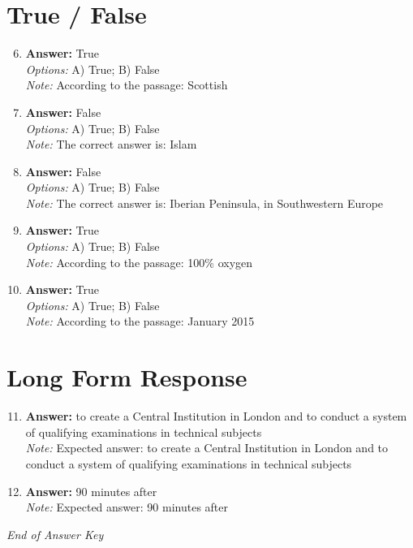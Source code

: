 \documentclass[12pt]{article}
\begin{document}
\section*{True / False}
\begin{enumerate}[label=\arabic*.]
\setcounter{enumi}{5}
\item \textbf{Answer:} True
\\ \textit{Options:} A) True; B) False
\\ \textit{Note:} According to the passage: Scottish
\item \textbf{Answer:} False
\\ \textit{Options:} A) True; B) False
\\ \textit{Note:} The correct answer is: Islam
\item \textbf{Answer:} False
\\ \textit{Options:} A) True; B) False
\\ \textit{Note:} The correct answer is: Iberian Peninsula, in Southwestern Europe
\item \textbf{Answer:} True
\\ \textit{Options:} A) True; B) False
\\ \textit{Note:} According to the passage: 100\% oxygen
\item \textbf{Answer:} True
\\ \textit{Options:} A) True; B) False
\\ \textit{Note:} According to the passage: January 2015
\end{enumerate}

\section*{Long Form Response}
\begin{enumerate}[label=\arabic*.]
\setcounter{enumi}{10}
\item \textbf{Answer:} to create a Central Institution in London and to conduct a system of qualifying examinations in technical subjects
\\ \textit{Note:} Expected answer: to create a Central Institution in London and to conduct a system of qualifying examinations in technical subjects
\item \textbf{Answer:} 90 minutes after
\\ \textit{Note:} Expected answer: 90 minutes after
\end{enumerate}

\vfill
\noindent\textit{End of Answer Key}
\end{document}
